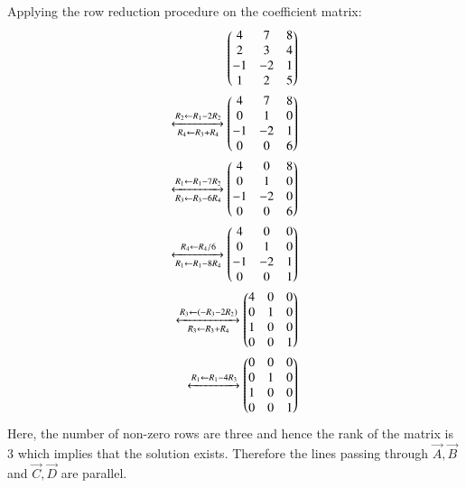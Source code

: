 Applying the row reduction procedure on the coefficient matrix:
\begin{align}
	\begin{pmatrix}4 & 7 & 8\\ 2 & 3 & 4\\ -1 & -2 & 1\\ 1 & 2 & 5\end{pmatrix}\\
	\xleftrightarrow[R_4 \leftarrow R_3 + R_4]{R_2 \leftarrow R_1 - 2R_2}
	\begin{pmatrix}4 & 7 & 8\\ 0 & 1 & 0\\ -1 & -2 & 1\\ 0 & 0 & 6\end{pmatrix}\\
	\xleftrightarrow[R_3 \leftarrow R_3 - 6R_4]{R_1 \leftarrow R_1 - 7R_2}
	\begin{pmatrix}4 & 0 & 8\\ 0 & 1 & 0\\ -1 & -2 & 0\\ 0 & 0 & 6\end{pmatrix}\\
	\xleftrightarrow[R_1 \leftarrow R_1 - 8R_4]{R_4 \leftarrow R_4/6}
	\begin{pmatrix}4 & 0 & 0\\ 0 & 1 & 0\\ -1 & -2 & 1\\ 0 & 0 & 1 \end{pmatrix} \\
    \xleftrightarrow[R_3 \leftarrow R_3 + R_4]{R_3 \leftarrow (-R_3 - 2R_2)}
	\begin{pmatrix}4 & 0 & 0\\ 0 & 1 & 0\\ 1 & 0 & 0\\ 0 & 0 & 1\end{pmatrix}\\
	\xleftrightarrow{R_1 \leftarrow R_1 - 4R_3}
	\begin{pmatrix}0 & 0 & 0\\ 0 & 1 & 0\\ 1 & 0 & 0\\ 0 & 0 & 1\end{pmatrix}
\end{align}
Here, the number of non-zero rows are three and hence the rank of the matrix is 3 which implies that the solution exists. Therefore the lines passing through $\vec{A}, \vec{B}$ and $\vec{C}, \vec{D}$ are parallel.

